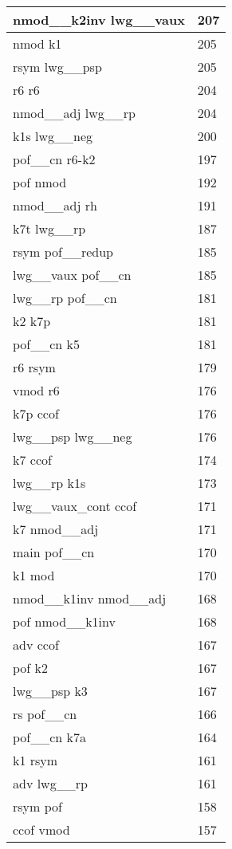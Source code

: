 \documentclass[a4 paper]{article}
\begin{document}
\begin{longtable}{p{}p{}}
nmod\_\_k2inv lwg\_\_vaux  & 207 \\ \midrule
nmod k1  & 205 \\ \midrule
rsym lwg\_\_psp  & 205 \\ \midrule
r6 r6  & 204 \\ \midrule
nmod\_\_adj lwg\_\_rp  & 204 \\ \midrule
k1s lwg\_\_neg  & 200 \\ \midrule
pof\_\_cn r6-k2  & 197 \\ \midrule
pof nmod  & 192 \\ \midrule
nmod\_\_adj rh  & 191 \\ \midrule
k7t lwg\_\_rp  & 187 \\ \midrule
rsym pof\_\_redup  & 185 \\ \midrule
lwg\_\_vaux pof\_\_cn  & 185 \\ \midrule
lwg\_\_rp pof\_\_cn  & 181 \\ \midrule
k2 k7p  & 181 \\ \midrule
pof\_\_cn k5  & 181 \\ \midrule
r6 rsym  & 179 \\ \midrule
vmod r6  & 176 \\ \midrule
k7p ccof  & 176 \\ \midrule
lwg\_\_psp lwg\_\_neg  & 176 \\ \midrule
k7 ccof  & 174 \\ \midrule
lwg\_\_rp k1s  & 173 \\ \midrule
lwg\_\_vaux\_cont ccof  & 171 \\ \midrule
k7 nmod\_\_adj  & 171 \\ \midrule
main pof\_\_cn  & 170 \\ \midrule
k1 mod  & 170 \\ \midrule
nmod\_\_k1inv nmod\_\_adj  & 168 \\ \midrule
pof nmod\_\_k1inv  & 168 \\ \midrule
adv ccof  & 167 \\ \midrule
pof k2  & 167 \\ \midrule
lwg\_\_psp k3  & 167 \\ \midrule
rs pof\_\_cn  & 166 \\ \midrule
pof\_\_cn k7a  & 164 \\ \midrule
k1 rsym  & 161 \\ \midrule
adv lwg\_\_rp  & 161 \\ \midrule
rsym pof  & 158 \\ \midrule
ccof vmod  & 157 \\ \midrule

\end{longtable}
\end{document}
